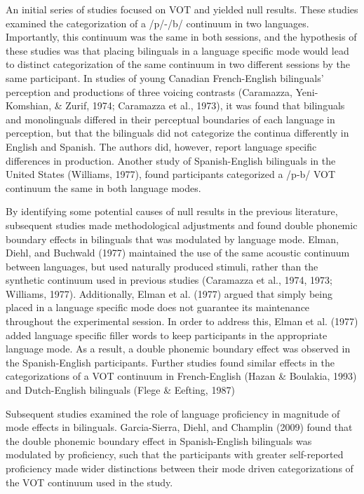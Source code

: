 \documentclass[
  man]{apa6}
\begin{document}
An initial series of studies focused on VOT and yielded null results. These studies examined the categorization of a /p/-/b/ continuum in two languages. Importantly, this continuum was the same in both sessions, and the hypothesis of these studies was that placing bilinguals in a language specific mode would lead to distinct categorization of the same continuum in two different sessions by the same participant. In studies of young Canadian French-English bilinguals' perception and productions of three voicing contrasts (Caramazza, Yeni-Komshian, \& Zurif, 1974; Caramazza et al., 1973), it was found that bilinguals and monolinguals differed in their perceptual boundaries of each language in perception, but that the bilinguals did not categorize the continua differently in English and Spanish. The authors did, however, report language specific differences in production. Another study of Spanish-English bilinguals in the United States (Williams, 1977), found participants categorized a /p-b/ VOT continuum the same in both language modes.

By identifying some potential causes of null results in the previous literature, subsequent studies made methodological adjustments and found double phonemic boundary effects in bilinguals that was modulated by language mode.
Elman, Diehl, and Buchwald (1977) maintained the use of the same acoustic continuum between languages, but used naturally produced stimuli, rather than the synthetic continuum used in previous studies (Caramazza et al., 1974, 1973; Williams, 1977).
Additionally, Elman et al. (1977) argued that simply being placed in a language specific mode does not guarantee its maintenance throughout the experimental session.
In order to address this, Elman et al. (1977) added language specific filler words to keep participants in the appropriate language mode.
As a result, a double phonemic boundary effect was observed in the Spanish-English participants.
Further studies found similar effects in the categorizations of a VOT continuum in French-English (Hazan \& Boulakia, 1993) and Dutch-English bilinguals (Flege \& Eefting, 1987)

Subsequent studies examined the role of language proficiency in magnitude of mode effects in bilinguals.
Garcia-Sierra, Diehl, and Champlin (2009) found that the double phonemic boundary effect in Spanish-English bilinguals was modulated by proficiency, such that the participants with greater self-reported proficiency made wider distinctions between their mode driven categorizations of the VOT continuum used in the study.
\end{document}
